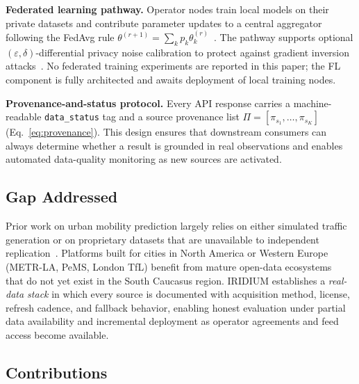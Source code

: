 \noindent\textbf{Federated learning pathway.}
Operator nodes train local models on their private datasets and contribute
parameter updates to a central aggregator following the FedAvg rule
$\theta^{(r+1)} = \sum_k p_k\theta_k^{(r)}$~\cite{mcmahan2017fedavg}.
The pathway supports optional $(\varepsilon,\delta)$-differential privacy
noise calibration to protect against gradient inversion
attacks~\cite{kairouz2021advances}.
No federated training experiments are reported in this paper; the FL
component is fully architected and awaits deployment of local training nodes.

\noindent\textbf{Provenance-and-status protocol.}
Every API response carries a machine-readable \texttt{data\_status} tag
and a source provenance list $\Pi = [\pi_{s_1},\ldots,\pi_{s_K}]$
(Eq.~\ref{eq:provenance}).
This design ensures that downstream consumers can always determine whether
a result is grounded in real observations and enables automated data-quality
monitoring as new sources are activated.

\subsection*{Gap Addressed}

Prior work on urban mobility prediction largely relies on either simulated
traffic generation or on proprietary datasets that are unavailable to
independent replication~\cite{pan2019urban,yao2019revisiting,wang2020traffic}.
Platforms built for cities in North America or Western Europe
(METR-LA, PeMS, London TfL) benefit from mature open-data
ecosystems~\cite{li2018dcrnn,wu2019graphwavenet} that do not yet exist
in the South Caucasus region.
IRIDIUM establishes a \textit{real-data stack} in which every source is
documented with acquisition method, license, refresh cadence, and fallback
behavior, enabling honest evaluation under partial data availability and
incremental deployment as operator agreements and feed access become
available.

\subsection*{Contributions}

